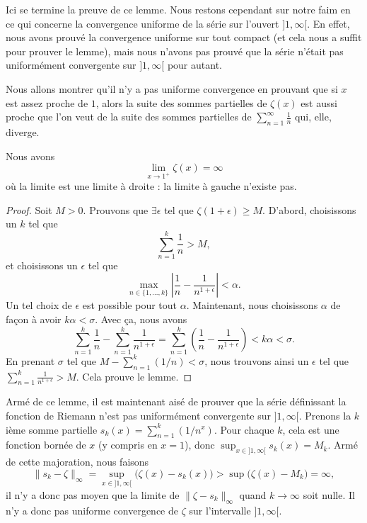 Ici se termine la preuve de ce lemme. Nous restons cependant sur notre faim en ce qui concerne la convergence uniforme de la série sur l'ouvert \( ]1,\infty[\). En effet, nous avons prouvé la convergence uniforme sur tout compact (et cela nous a suffit pour prouver le lemme), mais nous n'avons pas prouvé que la série n'était pas uniformément convergente sur \( ]1,\infty[\) pour autant.

	Nous allons montrer qu'il n'y a pas uniforme convergence en prouvant que si \( x\) est assez proche de \( 1\), alors la suite des sommes partielles de \( \zeta(x)\) est aussi proche que l'on veut de la suite des sommes partielles de \( \sum_{n=1}^{\infty}\frac{1}{ n }\) qui, elle, diverge.

	\begin{lemma}
		Nous avons
		\begin{equation}
			\lim_{x\to 1^+}\zeta(x)=\infty
		\end{equation}
		où la limite est une limite à droite : la limite à gauche n'existe pas.
	\end{lemma}

	\begin{proof}
		Soit \( M>0\). Prouvons que \( \exists\epsilon\) tel que \( \zeta(1+\epsilon)\geq M\). D'abord, choisissons un \( k\) tel que
		\begin{equation}
			\sum_{n=1}^k\frac{1}{ n }>M,
		\end{equation}
		et choisissons un \( \epsilon\) tel que
		\begin{equation}
			\max_{n\in\{ 1,\ldots,k \}}\left|  \frac{1}{ n }-\frac{1}{ n^{1+\epsilon} }\right|<\alpha.
		\end{equation}
		Un tel choix de \( \epsilon\) est possible pour tout \( \alpha\). Maintenant, nous choisissons \( \alpha\) de façon à avoir \( k\alpha<\sigma\). Avec ça, nous avons
		\begin{equation}
			\sum_{n=1}^k\frac{1}{ n }-\sum_{n=1}^k\frac{1}{ n^{1+\epsilon} }=\sum_{n=1}^k\left( \frac{1}{ n }-\frac{1}{ n^{1+\epsilon} } \right)<k\alpha<\sigma.
		\end{equation}
		En prenant \( \sigma\) tel que \( M-\sum_{n=1}^k(1/n)<\sigma\), nous trouvons ainsi un \( \epsilon\) tel que \( \sum_{n=1}^k\frac{1}{ n^{1+\epsilon} }>M\). Cela prouve le lemme.
	\end{proof}

	Armé de ce lemme, il est maintenant aisé de prouver que la série définissant la fonction de Riemann n'est pas uniformément convergente sur \( ]1,\infty[\). Prenons la \( k\)ième somme partielle \( s_k(x)=\sum_{n=1}^k(1/n^x)\). Pour chaque \( k\), cela est une fonction bornée de \( x\) (y compris en \( x=1\)), donc \( \sup_{x\in]1,\infty[}s_k(x)=M_k\). Armé de cette majoration, nous faisons
\begin{equation}
	\| s_k-\zeta \|_{\infty}=\sup_{x\in]1,\infty[}\big( \zeta(x)-s_k(x) \big)>\sup\big( \zeta(x)-M_k \big)=\infty,
\end{equation}
il n'y a donc pas moyen que la limite de \( \| \zeta-s_k \|_{\infty}\) quand \( k\to\infty\) soit nulle. Il n'y a donc pas uniforme convergence de \( \zeta\) sur l'intervalle \( ]1,\infty[\).

